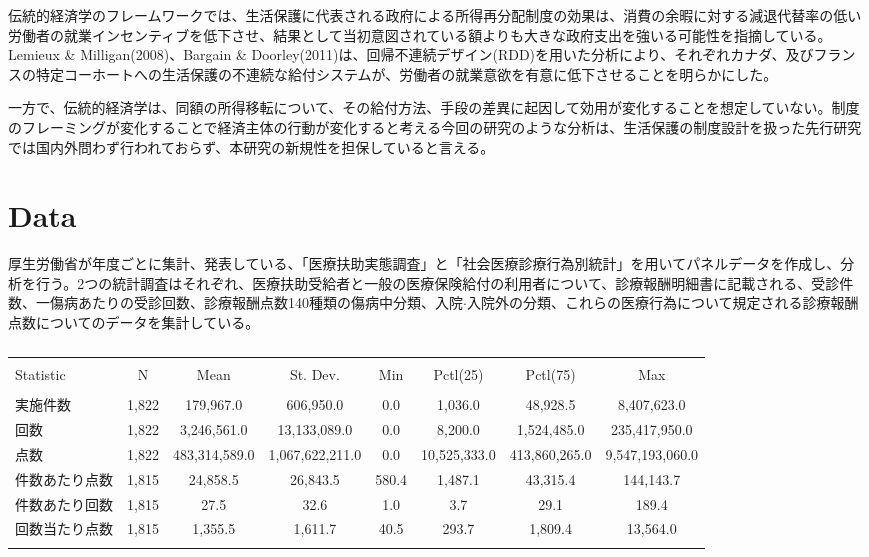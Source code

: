 \documentclass{jsarticle}
\begin{document}
伝統的経済学のフレームワークでは、生活保護に代表される政府による所得再分配制度の効果は、消費の余暇に対する減退代替率の低い労働者の就業インセンティブを低下させ、結果として当初意図されている額よりも大きな政府支出を強いる可能性を指摘している。Lemieux \& Milligan(2008)、Bargain \& Doorley(2011)は、回帰不連続デザイン(RDD)を用いた分析により、それぞれカナダ、及びフランスの特定コーホートへの生活保護の不連続な給付システムが、労働者の就業意欲を有意に低下させることを明らかにした。

一方で、伝統的経済学は、同額の所得移転について、その給付方法、手段の差異に起因して効用が変化することを想定していない。制度のフレーミングが変化することで経済主体の行動が変化すると考える今回の研究のような分析は、生活保護の制度設計を扱った先行研究では国内外問わず行われておらず、本研究の新規性を担保していると言える。

\section{Data}

厚生労働省が年度ごとに集計、発表している、「医療扶助実態調査」と「社会医療診療行為別統計」を用いてパネルデータを作成し、分析を行う。2つの統計調査はそれぞれ、医療扶助受給者と一般の医療保険給付の利用者について、診療報酬明細書に記載される、受診件数、一傷病あたりの受診回数、診療報酬点数140種類の傷病中分類、入院$\cdot$入院外の分類、これらの医療行為について規定される診療報酬点数についてのデータを集計している。

\footnotesize

\begin{table}[!htbp] \centering 
  \caption{} 
  \label{} 
\begin{tabular}{@{\extracolsep{3pt}}lccccccc} 
\\[-1.8ex]\hline 
\hline \\[-1.8ex] 
Statistic & \multicolumn{1}{c}{N} & \multicolumn{1}{c}{Mean} & \multicolumn{1}{c}{St. Dev.} & \multicolumn{1}{c}{Min} & \multicolumn{1}{c}{Pctl(25)} & \multicolumn{1}{c}{Pctl(75)} & \multicolumn{1}{c}{Max} \\ 
\hline \\[-1.8ex] 
実施件数 & 1,822 & 179,967.0 & 606,950.0 & 0.0 & 1,036.0 & 48,928.5 & 8,407,623.0 \\ 
回数 & 1,822 & 3,246,561.0 & 13,133,089.0 & 0.0 & 8,200.0 & 1,524,485.0 & 235,417,950.0 \\ 
点数 & 1,822 & 483,314,589.0 & 1,067,622,211.0 & 0.0 & 10,525,333.0 & 413,860,265.0 & 9,547,193,060.0 \\ 
件数あたり点数 & 1,815 & 24,858.5 & 26,843.5 & 580.4 & 1,487.1 & 43,315.4 & 144,143.7 \\ 
件数あたり回数 & 1,815 & 27.5 & 32.6 & 1.0 & 3.7 & 29.1 & 189.4 \\ 
回数当たり点数 & 1,815 & 1,355.5 & 1,611.7 & 40.5 & 293.7 & 1,809.4 & 13,564.0 \\ 
\hline \\[-1.8ex] 
\end{tabular} 
\end{table} 
\end{document}
